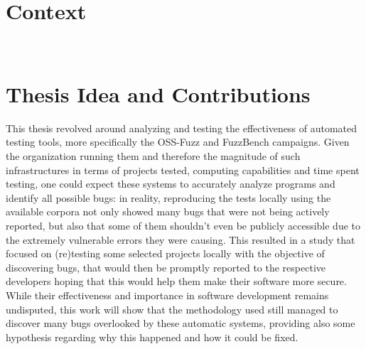 \newpage
\section{Context}


\ \\
\section{Thesis Idea and Contributions}
This thesis revolved around analyzing and testing the effectiveness of automated testing tools, more specifically the OSS-Fuzz and FuzzBench campaigns.
\newline
Given the organization running them and therefore the magnitude of such infrastructures in terms of projects tested, computing capabilities and time spent testing, one could expect these systems to accurately analyze programs and identify all possible bugs: in reality, reproducing the tests locally using the available corpora not only showed many bugs that were not being actively reported, but also that some of them shouldn't even be publicly accessible due to the extremely vulnerable errors they were causing.
\newline
This resulted in a study that focused on (re)testing some selected projects locally with the objective of discovering bugs, that would then be promptly reported to the respective developers hoping that this would help them make their software more secure. 
\newline
While their effectiveness and importance in software development remains undisputed, this work will show that the methodology used still managed to discover many bugs overlooked by these automatic systems, providing also some hypothesis regarding why this happened and how it could be fixed.


\ \\
